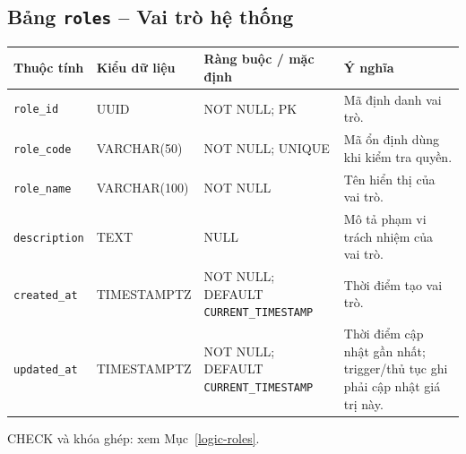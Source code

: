 \subsection{Bảng \texttt{roles} -- Vai trò hệ thống}
\label{dictionary-roles}
\begingroup
\footnotesize
\setlength{\tabcolsep}{3pt}
\begin{longtable}{>{\raggedright\arraybackslash}p{3.1cm}>{\raggedright\arraybackslash}p{2.5cm}>{\raggedright\arraybackslash}p{3.7cm}>{\raggedright\arraybackslash}p{4.3cm}}
\toprule
Thuộc tính & Kiểu dữ liệu & Ràng buộc / mặc định & Ý nghĩa \\
\midrule
\endhead
\texttt{role\_\allowbreak{}id} & UUID & NOT NULL; PK & Mã định danh vai trò. \\
\texttt{role\_\allowbreak{}code} & VARCHAR(50) & NOT NULL; UNIQUE & Mã ổn định dùng khi kiểm tra quyền. \\
\texttt{role\_\allowbreak{}name} & VARCHAR(100) & NOT NULL & Tên hiển thị của vai trò. \\
\texttt{description} & TEXT & NULL & Mô tả phạm vi trách nhiệm của vai trò. \\
\texttt{created\_\allowbreak{}at} & TIMESTAMPTZ & NOT NULL; DEFAULT \texttt{CURRENT\_\allowbreak{}TIMESTAMP} & Thời điểm tạo vai trò. \\
\texttt{updated\_\allowbreak{}at} & TIMESTAMPTZ & NOT NULL; DEFAULT \texttt{CURRENT\_\allowbreak{}TIMESTAMP} & Thời điểm cập nhật gần nhất; trigger/thủ tục ghi phải cập nhật giá trị này. \\
\bottomrule
\end{longtable}
\endgroup
CHECK và khóa ghép: xem Mục~\ref{logic-roles}.
